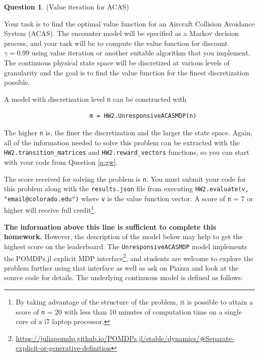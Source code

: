 \documentclass{article}
\theoremstyle{definition}
\newtheorem{question}[thm]{Question}
\begin{document}
\begin{question}
    (Value iteration for ACAS)

Your task is to find the optimal value function for an Aircraft Collision Avoidance System (ACAS). The encounter model will be specified as a Markov decision process, and your task will be to compute the value function for discount $\gamma=0.99$ using value iteration or another suitable algorithm that you implement. The continuous physical state space will be discretized at various levels of granularity and the goal is to find the value function for the finest discretization possible.

A model with discretization level \texttt{n} can be constructed with
\begin{verbatim}
                        m = HW2.UnresponsiveACASMDP(n)
\end{verbatim}
The higher \texttt{n} is, the finer the discretization and the larger the state space. Again, all of the information needed to solve this problem can be extracted with the \texttt{HW2.transition\_matrices} and \texttt{HW2.reward\_vectors} functions, so you can start with your code from Question \ref{q:gw}.

The score received for solving the problem is \texttt{n}. You must submit your code for this problem along with the \texttt{results.json} file from executing \texttt{HW2.evaluate(v, "email@colorado.edu")} where \texttt{v} is the value function vector. A score of \texttt{n} = 7 or higher will receive full credit\footnote{By taking advantage of the structure of the problem, it is possible to attain a score of \texttt{n} = 20 with less than 10 minutes of computation time on a single core of a i7 laptop processor.}.

\vspace{1em}
\noindent\makebox[\linewidth]{\rule{\textwidth}{0.4pt}}
\vspace{1em}

\textbf{The information above this line is sufficient to complete this homework.} However, the description of the model below may help to get the highest score on the leaderboard. The \texttt{UnresponsiveACASMDP} model implements the POMDPs.jl explicit MDP interface\footnote{\url{https://juliapomdp.github.io/POMDPs.jl/stable/dynamics/\#Separate-explicit-or-generative-definition}}, and students are welcome to explore the problem further using that interface as well as ask on Piazza and look at the source code for details. The underlying continuous model is defined as follows:


\end{question}
\end{document}
